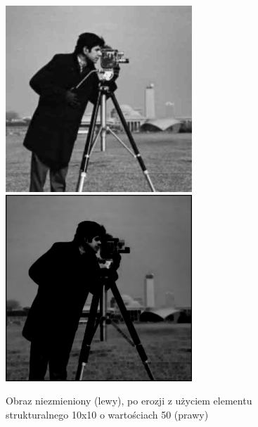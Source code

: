 \documentclass[a4paper,12pt]{book}
\begin{document}
\begin{figure}[H]
	\caption{Obraz niezmieniony (lewy), po erozji z użyciem elementu strukturalnego 10x10 o wartościach 50 (prawy)}
	\includegraphics[width=7cm, height=7cm]{man-unmodified.jpg}
	\includegraphics[width=7cm, height=7cm]{morph-gray-erosion-strel10x10-50.png}
\end{figure}
\end{document}

